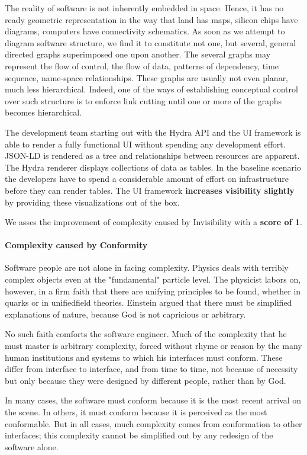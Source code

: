 The reality of software is not inherently embedded in space. Hence, it has no ready geometric representation in the way that land has maps, silicon chips have diagrams, computers have connectivity schematics. As soon as we attempt to diagram software structure, we find it to constitute not one, but several, general directed graphs superimposed one upon another. The several graphs may represent the flow of control, the flow of data, patterns of dependency, time sequence, name-space relationships. These graphs are usually not even planar, much less hierarchical. Indeed, one of the ways of establishing conceptual control over such structure is to enforce link cutting until one or more of the graphs becomes hierarchical. \citep{nosilverbullet}

The development team starting out with the Hydra API and the UI framework is able to render a fully functional UI without spending any development effort. JSON-LD is rendered as a tree and relationships between resources are apparent. The Hydra renderer displays collections of data as tables. In the baseline scenario the developers have to spend a considerable amount of effort on infrastructure before they can render tables. The UI framework \textbf{increases visibility slightly} by providing these visualizations out of the box.

We asses the improvement of complexity caused by Invisibility with a \textbf{score of 1}.

\paragraph{Complexity caused by Conformity}
Software people are not alone in facing complexity. Physics deals with terribly complex objects even at the "fundamental" particle level. The physicist labors on, however, in a firm faith that there are unifying principles to be found, whether in quarks or in unifiedfield theories. Einstein argued that there must be simplified explanations of nature, because God is not capricious or arbitrary.

No such faith comforts the software engineer. Much of the complexity that he must master is arbitrary complexity, forced without rhyme or reason by the many human institutions and systems to which his interfaces must conform. These differ from interface to interface, and from time to time, not because of necessity but only because they were designed by different people, rather than by God.

In many cases, the software must conform because it is the most recent arrival on the scene. In others, it must conform because it is perceived as the most conformable. But in all cases, much complexity comes from conformation to other interfaces; this complexity cannot be simplified out by any redesign of the software alone. \citep{nosilverbullet}

